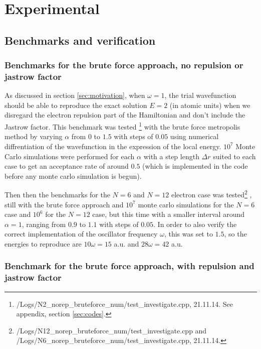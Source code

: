 \section{Experimental}

\subsection{Benchmarks and verification} \label{sec:exp_benchmarks}

\subsubsection{Benchmarks for the brute force approach, no repulsion or jastrow factor}
As discussed in section \ref{sec:motivation}, when $\omega = 1$, the trial wavefunction should be able to reproduce the exact solution $E=2$ (in atomic units) when we disregard the electron repulsion part of the Hamiltonian and don't include the Jastrow factor. 
This benchmark was tested
\footnote{/Logs/N2\_norep\_bruteforce\_num/test\_investigate.cpp, 21.11.14. See appendix, section \ref{sec:codes}.}
with the brute force metropolis method by varying $\alpha$ from $0$ to $1.5$ with steps of $0.05$ using numerical diffrentiation of the wavefunction in the expression of the local energy. 
$10^7$ Monte Carlo simulations were performed for each $\alpha$ with a step length $\Delta r$ suited to each case to get an acceptance rate of around $0.5$ (which is implemented in the code before any monte carlo simulation is begun).

Then then the benchmarks for the $N=6$ and $N=12$ electron case was tested\footnote{/Logs/N12\_norep\_bruteforce\_num/test\_investigate.cpp and /Logs/N6\_norep\_bruteforce\_num/test\_investigate.cpp, 21.11.14. }
, still with the brute force approach and $10^7$ monte carlo simulations for the $N=6$ case and $10^6$ for the $N=12$ case, but this time with a smaller interval around $\alpha=1$, ranging from $0.9$ to $1.1$ with steps of $0.05$. 
In order to also verify the correct implementation of the oscillator frequency $\omega$, this was set to $1.5$, so the energies to reproduce are $10 \omega = 15$ a.u. and $28 \omega = 42$ a.u. 

\subsubsection{Benchmark for the brute force approach, with repulsion and jastrow factor} \label{sec:exp_N2rep}

